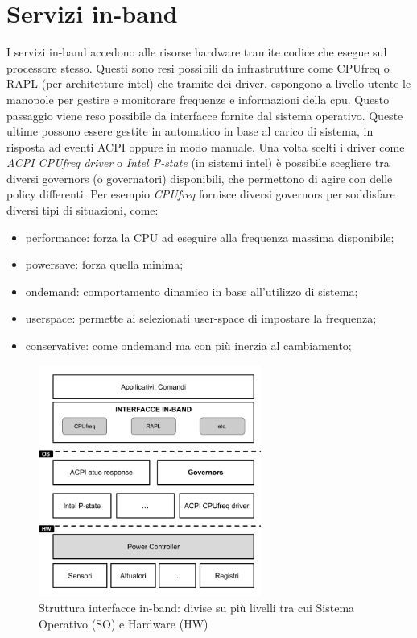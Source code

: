 
\section{Servizi in-band}
I servizi in-band accedono alle risorse hardware tramite codice che esegue sul processore stesso. Questi sono resi possibili da infrastrutture come CPUfreq\cite{CPUfreq} o RAPL\cite{RAPL} (per architetture intel) che tramite dei driver, espongono a livello utente le manopole per gestire e monitorare frequenze e informazioni della cpu. Questo passaggio viene reso possibile da interfacce fornite dal sistema operativo. Queste ultime possono essere gestite in automatico in base al carico di sistema, in risposta ad eventi ACPI oppure in modo manuale. Una volta scelti i driver come \emph{ACPI CPUfreq driver} o \emph{Intel P-state} (in sistemi intel) è possibile scegliere tra diversi governors (o governatori) disponibili, che permettono di agire con delle policy differenti.
Per esempio \emph{CPUfreq} fornisce diversi governors per soddisfare diversi tipi di situazioni, come:
\begin{itemize}
    \item performance: forza la CPU ad eseguire alla frequenza massima disponibile;
    \item powersave: forza quella minima;
    \item ondemand: comportamento dinamico in base all'utilizzo di sistema;
    \item userspace: permette ai selezionati user-space di impostare la frequenza; 
    \item conservative: come ondemand ma con più inerzia al cambiamento;
\end{itemize}

\begin{figure}[H]
    \centering
    \includegraphics[width=0.65\textwidth]{img/in-band.png}
    \caption{Struttura interfacce in-band: divise su più livelli tra cui Sistema Operativo (SO) e Hardware (HW)}\label{fig:inband}
\end{figure}

